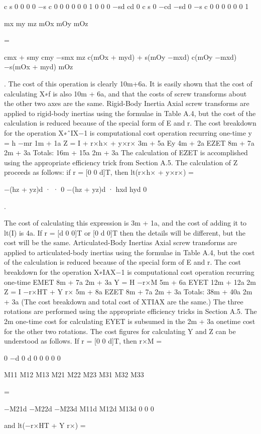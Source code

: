 c s 0 0 0 0 −s c 0 0 0 0 0 0 1 0 0 0 −sd cd 0 c s 0 −cd −sd 0 −s c 0 0 0 0 0 0 1

mx my mz mOx mOy mOz

=

cmx + smy cmy −smx mz c(mOx + myd) + s(mOy −mxd) c(mOy −mxd) −s(mOx + myd) mOz

. The cost of this operation is clearly 10m+6a. It is easily shown that the cost of calculating X∗f is also 10m + 6a, and that the costs of screw transforms about the other two axes are the same. Rigid-Body Inertia Axial screw transforms are applied to rigid-body inertias using the formulae in Table A.4, but the cost of the calculation is reduced because of the special form of E and r. The cost breakdown for the operation X∗ˆIX−1 is computational cost operation recurring one-time y = h −mr 1m + 1a Z = I + r×h× + y×r× 3m + 5a Ey 4m + 2a EZET 8m + 7a 2m + 3a Totals: 16m + 15a 2m + 3a The calculation of EZET is accomplished using the appropriate efficiency trick from Section A.5. The calculation of Z proceeds as follows: if r = [0 0 d]T, then lt(r×h× + y×r×) =

−(hz + yz)d · · 0 −(hz + yz)d · hxd hyd 0

.

The cost of calculating this expression is 3m + 1a, and the cost of adding it to lt(I) is 4a. If r = [d 0 0]T or [0 d 0]T then the details will be different, but the cost will be the same. Articulated-Body Inertias Axial screw transforms are applied to articulated-body inertias using the formulae in Table A.4, but the cost of the calculation is reduced because of the special form of E and r. The cost breakdown for the operation X∗IAX−1 is computational cost operation recurring one-time EMET 8m + 7a 2m + 3a Y = H −r×M 5m + 6a EYET 12m + 12a 2m Z = I −r×HT + Y r× 5m + 8a EZET 8m + 7a 2m + 3a Totals: 38m + 40a 2m + 3a (The cost breakdown and total cost of XTIAX are the same.) The three rotations are performed using the appropriate efficiency tricks in Section A.5. The 2m one-time cost for calculating EYET is subsumed in the 2m + 3a onetime cost for the other two rotations. The cost figures for calculating Y and Z can be understood as follows. If r = [0 0 d]T, then r×M =

0 −d 0 d 0 0 0 0 0

M11 M12 M13 M21 M22 M23 M31 M32 M33

=

−M21d −M22d −M23d M11d M12d M13d 0 0 0

and lt(−r×HT + Y r×) =

